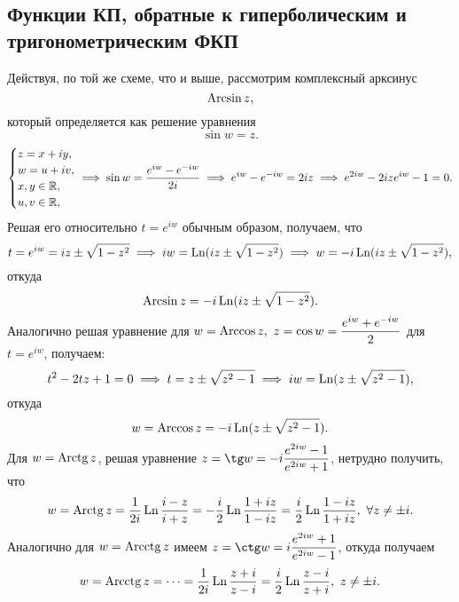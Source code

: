\documentclass[../../main.tex]{subfiles}
\begin{document}
\subsection{Функции КП, обратные к гиперболическим и тригонометрическим ФКП}

Действуя, по той же схеме, что и выше,
рассмотрим комплексный арксинус
\begin{equation}
\label{lec27:23}
\operatorname{Arcsin} z,
\end{equation} который определяется как решение уравнения
\begin{equation}
\label{lec27:24}
\sin w = z.
\end{equation}
\[
\begin{cases}
	z = x + iy,\\
	w = u + iv,\\
	x, y \in \mathbb{R}, \\
	u, v \in \mathbb{R},
\end{cases} \hspace{-1em}\implies
\sin w = \dfrac{e^{iw} - e^{-iw}}{2i} \implies
e^{iw} - e^{-iw} = 2iz \implies
e^{2iw} - 2ize^{iw} - 1 = 0.
\]
Решая его относительно $ t = e^{iw} $ обычным образом, получаем, что
\[
t = e^{iw} = iz \pm \sqrt{1 - z^2} \implies
iw = \operatorname{Ln}(iz \pm \sqrt{1 - z^2}) \implies
w = -i\operatorname{Ln}(iz \pm \sqrt{1 - z^2}),
\]
откуда
\begin{equation}
\label{lec27:25}
\operatorname{Arcsin} z = -i\operatorname{Ln}(iz\pm\sqrt{1 - z^2}).
\end{equation}
Аналогично решая уравнение для $ w = \operatorname{Arccos} z,\ z = \cos w = 
\dfrac{e^{iw} + e^{-iw}}{2} $ для $ t = e^{iw} $, получаем:
\[
t^2 - 2tz + 1 = 0 \implies
t = z \pm \sqrt{z^2 - 1} \implies
iw = \operatorname{Ln} (z \pm \sqrt{z^2 - 1}),
\]
откуда
\begin{equation}
\label{lec27:26}
w = \operatorname{Arccos} z = -i\operatorname{Ln}(z \pm \sqrt{z^2 - 1}).
\end{equation}
Для $ w = \operatorname{Arctg} z $, решая уравнение $ z = \tg w = 
-i\dfrac{e^{2iw} - 1}{e^{2iw} + 1} $, нетрудно получить, что 
\begin{equation}
\label{lec27:27}
w = \operatorname{Arctg} z = \dfrac{1}{2i} \operatorname{Ln} \dfrac{i - z}{i + z} = 
-\dfrac{i}{2} \operatorname{Ln}\dfrac{1 + iz}{1 - iz} = 
\dfrac{i}{2} \operatorname{Ln}\dfrac{1 - iz}{1 + iz},\ \forall z \neq \pm i.
\end{equation}
Аналогично для $ w = \operatorname{Arcctg} z $ имеем $ z = \ctg w = 
i\dfrac{e^{2iw} + 1}{e^{2iw} - 1} $, откуда получаем
\begin{equation}
\label{lec27:28}
w = \operatorname{Arcctg} z = \dots = \dfrac{1}{2i} \operatorname{Ln} \dfrac{z + i}{z - i} = 
\dfrac{i}{2} \operatorname{Ln} \dfrac{z - i}{z + i},\ z \neq \pm i.
\end{equation}
\end{document}
